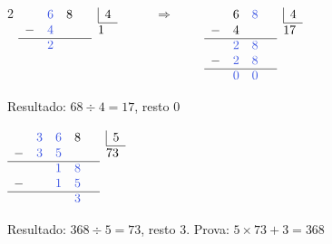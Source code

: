 \documentclass[12pt,twoside]{article}
\begin{document}
\begin{multicols}{2}
$\begin{array}[t]{lllll}
&\textcolor{iris}{6}&8& &\begin{array}[t]{|l}4 \\ \hline \end{array} \\
-&\textcolor{iris}{4}&&&1\\
\cline{1-4}
&\textcolor{iris}{2}&\\
\end{array}$
~~~~$\Rightarrow$~~~~
$\begin{array}[t]{lllll}
&6&\textcolor{iris}{8}& &\begin{array}[t]{|l}4 \\ \hline \end{array} \\
-&4&&&17\\
\cline{1-4}
&\textcolor{iris}{2}&\textcolor{iris}{8}\\
-&\textcolor{iris}{2}&\textcolor{iris}{8}\\
\cline{1-4}
&\textcolor{iris}{0}&\textcolor{iris}{0}\\
\end{array}$

\vspace{4pt}
Resultado: $68 \div 4 = 17$, resto $0$ \checkmark


\vspace{0.3cm}

$\begin{array}[t]{llllll}
&\textcolor{iris}{3}&\textcolor{iris}{6}&8&&\begin{array}[t]{|l}5\\\hline\end{array}\\
-&\textcolor{iris}{3}&\textcolor{iris}{5}&&&73\\
\cline{1-5}
&&\textcolor{iris}{1}&\textcolor{iris}{8}\\
-&&\textcolor{iris}{1}&\textcolor{iris}{5}\\
\cline{1-5}
&&&\textcolor{iris}{3}\\
\end{array}$

\vspace{4pt}
Resultado: $368 \div 5 = 73$, resto $3$. Prova: $5 \times 73 + 3 = 368$ \checkmark


\vspace{0.3cm}


\end{multicols}
\end{document}
